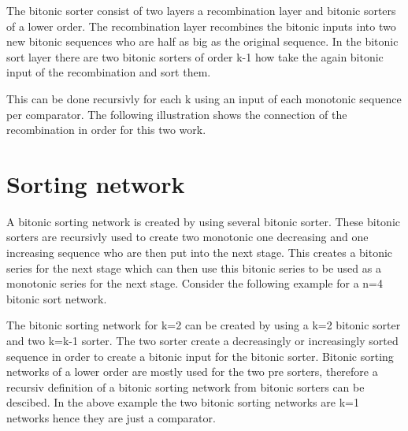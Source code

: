 \documentclass{article}
\newcommand{\compareBlock}[2][]{
    \pgfkeys{/compareBlock, default, #1}%
    \coordinate (\cbName_a) at ($(0, 1.33) + #2$);
    \coordinate (\cbName_b) at ($(0, 0.66) + #2$);
    \coordinate (\cbName_l) at ($(1.5, 0.66) + #2$);
    \coordinate (\cbName_h) at ($(1.5, 1.33) + #2$);

    \draw[color=\cbCA] (\cbName_a) -- ++(0.2, 0)node[anchor=west]{\cbA};
    \draw[color=\cbCB] (\cbName_b) -- ++(0.2, 0)node[anchor=west]{\cbB};
    \draw[color=\cbCL] (\cbName_l) -- ++(-0.2, 0)node[anchor=east]{\cbL};
    \draw[color=\cbCH] (\cbName_h) -- ++(-0.2, 0)node[anchor=east]{\cbH};
    \draw[draw=black] #2 rectangle ++(1.5,2);
}
\newcommand{\connectCB}[3]{
    \draw[color=#3] (#1) -- (#2);
}
\newcommand{\outputCB}[3]{
    \coordinate (#2) at ($(#1_h) + (0.25, 0)$);
    \coordinate (#3) at ($(#1_l) + (0.25, 0)$);
    \node at (#2) [anchor=west]{#2};
    \node at (#3) [anchor=west]{#3};
    \connectCB{#2}{#1_h}{black}
    \connectCB{#3}{#1_l}{black}
}
\begin{document}
The bitonic sorter consist of two layers a recombination layer and bitonic sorters of a lower order.
The recombination layer recombines the bitonic inputs into two new bitonic sequences who are half as big as the original sequence.
In the bitonic sort layer there are two bitonic sorters of order k-1 how take the again bitonic input of the recombination and sort them.

This can be done recursivly for each k using an input of each monotonic sequence per comparator.
The following illustration shows the connection of the recombination in order for this two work.



\section{Sorting network}

A bitonic sorting network is created by using several bitonic sorter. 
These bitonic sorters are recursivly used to create two monotonic one decreasing and one increasing sequence who are then put into the next stage.
This creates a bitonic series for the next stage which can then use this bitonic series to be used as a monotonic series for the next stage.
Consider the following example for a n=4 bitonic sort network.


The bitonic sorting network for k=2 can be created by using a k=2 bitonic sorter and two k=k-1 sorter.
The two sorter create a decreasingly or increasingly sorted sequence in order to create a bitonic input for the bitonic sorter.
Bitonic sorting networks of a lower order are mostly used for the two pre sorters, therefore a recursiv definition of a bitonic sorting network from bitonic sorters can be descibed.
In the above example the two bitonic sorting networks are k=1 networks hence they are just a comparator.
\end{document}
